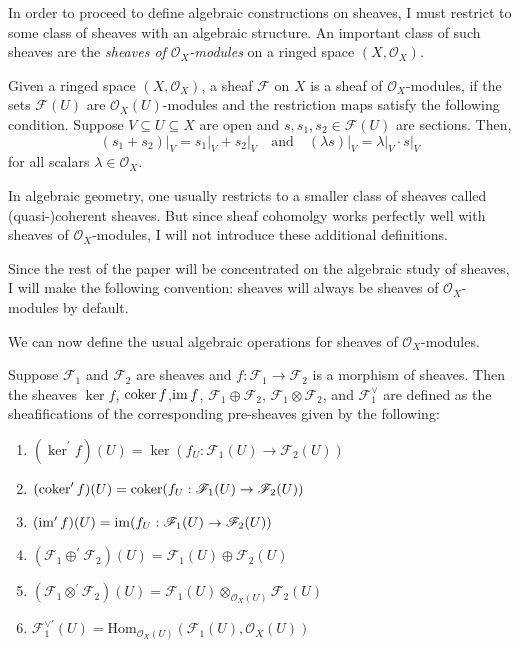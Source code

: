 In order to proceed to define algebraic constructions on sheaves, I must
restrict to some class of sheaves with an algebraic structure. An important
class of such sheaves are the \emph{sheaves of $\mathscr{O}_{X}$-modules}
on a ringed space $(X,\mathscr{O}_{X})$.
\begin{defin}
  Given a ringed space $(X,\mathscr{O}_{X})$, a sheaf $\mathscr{F}$ on $X$
  is a sheaf of $\mathscr{O}_{X}$-modules, if the sets $\mathscr{F}(U)$
  are $\mathscr{O}_{X}(U)$-modules and the restriction maps satisfy the
  following condition. Suppose $V\subseteq U\subseteq X$ are open and
  $s,s_{1}, s_{2}\in\mathscr{F}(U)$ are sections. Then,
  \[
    (s_{1}+s_{2})\vert_{V}=s_{1}\vert_{V}+s_{2}\vert_{V}\quad
    \text{and}\quad (\lambda s)\vert_{V}=\lambda\vert_{V}\cdot s\vert_{V}
  \]
  for all scalars $\lambda\in\mathscr{O}_{X}$.
\end{defin}
\begin{rem}
  In algebraic geometry, one usually restricts to a smaller class of sheaves
  called (quasi-)coherent sheaves. But since sheaf cohomolgy works perfectly
  well with sheaves of $\mathscr{O}_{X}$-modules, I will not introduce these
  additional definitions.
\end{rem}
\begin{lnote}
  Since the rest of the paper will be concentrated on the algebraic study of
  sheaves, I will make the following convention: sheaves will always be
  sheaves of $\mathscr{O}_{X}$-modules by default.
\end{lnote}
We can now define the usual algebraic operations for sheaves of
$\mathscr{O}_{X}$-modules.
\begin{defin}
  Suppose $\mathscr{F}_{1}$ and $\mathscr{F}_{2}$ are sheaves and
  $f:\mathscr{F}_{1}\to\mathscr{F}_{2}$ is a morphism of sheaves. Then the
  sheaves $\ker f$, $\operatorname{coker} f$,$\operatorname{im} f$,
  $\mathscr{F}_{1}\oplus\mathscr{F}_{2}$, $\mathscr{F}_{1}\otimes
  \mathscr{F}_{2}$, and $\mathscr{F}_{1}^{\vee}$ are defined as the
  sheafifications of the corresponding pre-sheaves given by the following:
  \begin{enumerate}
    \item $(\ker^{\prime} f)(U) = \ker(f_{U}:\mathscr{F}_{1}(U)
          \to\mathscr{F}_{2}(U))$
    \item $(\operatorname{coker}^{\prime} f)(U) = \operatorname{coker}(f_{U}:\mathscr{F}_{1}(U)
          \to\mathscr{F}_{2}(U))$
    \item $(\operatorname{im}^{\prime} f)(U)=\operatorname{im}(f_{U}:\mathscr{F}_{1}(U)
          \to\mathscr{F}_{2}(U))$
    \item $(\mathscr{F}_{1}\oplus^{\prime}\mathscr{F}_{2})(U)=\mathscr{F}_{1}(U)
          \oplus\mathscr{F}_{2}(U)$
    \item $(\mathscr{F}_{1}\otimes^{\prime}\mathscr{F}_{2})(U)
          =\mathscr{F}_{1}(U)\otimes_{\mathscr{O}_{X}(U)}\mathscr{F}_{2}(U)$
    \item $\mathscr{F}_{1}^{\vee\prime}(U)=\text{Hom}_{\mathscr{O}_{X}(U)}(
          \mathscr{F}_{1}(U),\mathscr{O}_{X}(U))$
  \end{enumerate}
\end{defin}
